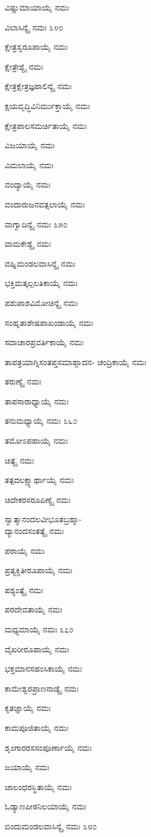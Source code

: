 ವಿಷ್ಣುಮಾಯಾಯೈ ನಮಃ

ವಿಲಾಸಿನ್ಯೈ ನಮಃ \num{೩೪೦}

ಕ್ಷೇತ್ರಸ್ವರೂಪಾಯೈ ನಮಃ

ಕ್ಷೇತ್ರೇಶ್ಯೈ ನಮಃ

ಕ್ಷೇತ್ರಕ್ಷೇತ್ರಜ್ಞಪಾಲಿನ್ಯೈ ನಮಃ

ಕ್ಷಯವೃದ್ಧಿವಿನಿರ್ಮುಕ್ತಾಯೈ ನಮಃ

ಕ್ಷೇತ್ರಪಾಲಸಮರ್ಚಿತಾಯೈ ನಮಃ

ವಿಜಯಾಯೈ ನಮಃ

ವಿಮಲಾಯೈ ನಮಃ

ವಂದ್ಯಾಯೈ ನಮಃ

ವಂದಾರುಜನವತ್ಸಲಾಯೈ ನಮಃ

ವಾಗ್ವಾದಿನ್ಯೈ ನಮಃ \num{೩೫೦}

ವಾಮಕೇಶ್ಯೈ ನಮಃ

ವಹ್ನಿಮಂಡಲವಾಸಿನ್ಯೈ ನಮಃ

ಭಕ್ತಿಮತ್ಕಲ್ಪಲತಿಕಾಯೈ ನಮಃ

ಪಶುಪಾಶವಿಮೋಚಿನ್ಯೈ ನಮಃ

ಸಂಹೃತಾಶೇಷಪಾಖಂಡಾಯೈ ನಮಃ

ಸದಾಚಾರಪ್ರವರ್ತಿಕಾಯೈ ನಮಃ

ತಾಪತ್ರಯಾಗ್ನಿಸಂತಪ್ತಸಮಾಹ್ಲಾದನ- ಚಂದ್ರಿಕಾಯೈ ನಮಃ

ತರುಣ್ಯೈ ನಮಃ

ತಾಪಸಾರಾಧ್ಯಾಯೈ ನಮಃ

ತನುಮಧ್ಯಾಯೈ ನಮಃ \num{೩೬೦}

ತಮೋಽಪಹಾಯೈ ನಮಃ

ಚಿತ್ಯೈ ನಮಃ

ತತ್ಪದಲಕ್ಷ್ಯಾರ್ಥಾಯೈ ನಮಃ

ಚಿದೇಕರಸರೂಪಿಣ್ಯೈ ನಮಃ

ಸ್ವಾತ್ಮಾನಂದಲವೀಭೂತಬ್ರಹ್ಮಾ-\\ದ್ಯಾನಂದಸಂತತ್ಯೈ ನಮಃ

ಪರಾಯೈ ನಮಃ

ಪ್ರತ್ಯಕ್ಚಿತೀರೂಪಾಯೈ ನಮಃ

ಪಶ್ಯಂತ್ಯೈ ನಮಃ

ಪರದೇವತಾಯೈ ನಮಃ

ಮಧ್ಯಮಾಯೈ ನಮಃ \num{೩೭೦}

ವೈಖರೀರೂಪಾಯೈ ನಮಃ

ಭಕ್ತಮಾನಸಹಂಸಿಕಾಯೈ ನಮಃ

ಕಾಮೇಶ್ವರಪ್ರಾಣನಾಡ್ಯೈ ನಮಃ

ಕೃತಜ್ಞಾಯೈ ನಮಃ

ಕಾಮಪೂಜಿತಾಯೈ ನಮಃ

ಶೃಂಗಾರರಸಸಂಪೂರ್ಣಾಯೈ ನಮಃ

ಜಯಾಯೈ ನಮಃ

ಜಾಲಂಧರಸ್ಥಿತಾಯೈ ನಮಃ

ಓಡ್ಯಾಣಪೀಠನಿಲಯಾಯೈ ನಮಃ

ಬಿಂದುಮಂಡಲವಾಸಿನ್ಯೈ ನಮಃ \num{೩೮೦}

